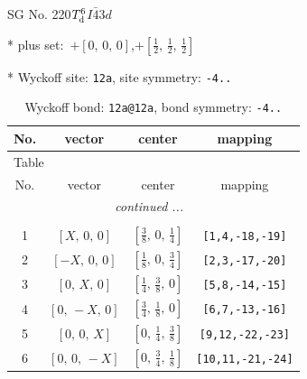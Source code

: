 \documentclass[fleqn,8pt]{jsarticle}
\begin{document}
\setcounter{MaxMatrixCols}{32}

\renewcommand{\tablename}{Table~}
\renewcommand{\figurename}{Figure~}
\begin{center}
\LARGE
SG No. 220\quad$T_{\rm d}^{6}$\quad$I\bar{4}3d$\quad[ cubic ]
\end{center}

* plus set:\,\,\,$+\left[ 0,\, 0,\, 0 \right]$,\quad $+\left[ \frac{1}{2},\, \frac{1}{2},\, \frac{1}{2} \right]$


* Wyckoff site: {\tt 12a}, site symmetry: {\tt -4..}
\renewcommand{\arraystretch}{1.2}
\begin{longtable}{cccc}
\caption{Wyckoff bond: {\tt 12a@12a}, bond symmetry: {\tt -4..}}
 \\
 \hline \hline
No. & vector & center & mapping \\ \hline \endfirsthead

\multicolumn{3}{l}{\tablename\ \thetable{}} \\
 \hline \hline
No. & vector & center & mapping \\ \hline \endhead

 \hline \hline
\multicolumn{3}{r}{\footnotesize\it continued ...} \\ \endfoot

 \hline \hline
\multicolumn{3}{r}{} \\ \endlastfoot

1 & $\left[ X,\, 0,\, 0 \right]$ & $\left[ \frac{3}{8},\, 0,\, \frac{1}{4} \right]$ & {\tt [1,4,-18,-19]} \\ \hline
2 & $\left[ - X,\, 0,\, 0 \right]$ & $\left[ \frac{1}{8},\, 0,\, \frac{3}{4} \right]$ & {\tt [2,3,-17,-20]} \\ \hline
3 & $\left[ 0,\, X,\, 0 \right]$ & $\left[ \frac{1}{4},\, \frac{3}{8},\, 0 \right]$ & {\tt [5,8,-14,-15]} \\ \hline
4 & $\left[ 0,\, - X,\, 0 \right]$ & $\left[ \frac{3}{4},\, \frac{1}{8},\, 0 \right]$ & {\tt [6,7,-13,-16]} \\ \hline
5 & $\left[ 0,\, 0,\, X \right]$ & $\left[ 0,\, \frac{1}{4},\, \frac{3}{8} \right]$ & {\tt [9,12,-22,-23]} \\ \hline
6 & $\left[ 0,\, 0,\, - X \right]$ & $\left[ 0,\, \frac{3}{4},\, \frac{1}{8} \right]$ & {\tt [10,11,-21,-24]} \\
\end{longtable}
\renewcommand{\arraystretch}{1.2}
\end{document}
